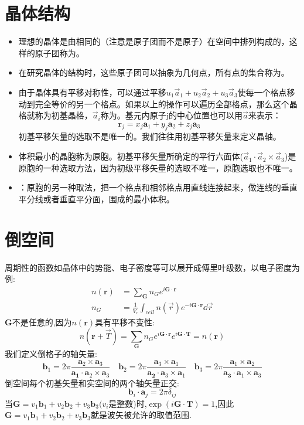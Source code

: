 \section{晶体结构}
\begin{itemize}
    \item 理想的晶体是由相同的（注意是原子团而不是原子）在空间中排列构成的，这样的原子团称为。
    \item 在研究晶体的结构时，这些原子团可以抽象为几何点，所有点的集合称为。
    \item 由于晶体具有平移对称性，可以通过平移$u_1\vec{a}_1+u_2\vec{a}_2+u_3\vec{a}_3$使每一个格点移动到完全等价的另一个格点。如果以上的操作可以遍历全部格点，那么这个晶格就称为初基晶格，$\vec{a}_i$称为。基元内原子j的中心位置也可以用$\vec{a}$来表示：
    \begin{equation*}
        \mathbf{r}_j=x_j\mathbf{a}_1+y_j\mathbf{a}_2+z_j\mathbf{a}_3
    \end{equation*}初基平移矢量的选取不是唯一的。我们往往用初基平移矢量来定义晶轴。
    \item 体积最小的晶胞称为原胞。初基平移矢量所确定的平行六面体($\vec{a}_1\cdot\vec{a}_2\times\vec{a}_3$)是原胞的一种选取方法，因为初级平移矢量的选取不唯一，原胞选取也不唯一。
    \item {}：原胞的另一种取法，把一个格点和相邻格点用直线连接起来，做连线的垂直平分线或者垂直平分面，围成的最小体积。
\end{itemize}
\section{倒空间}
周期性的函数如晶体中的势能、电子密度等可以展开成傅里叶级数，以电子密度为例:
\begin{align}
    n(\mathbf{r})&=\sum_{\mathbf{G}}n_Ge^{i\mathbf{G}\cdot\mathbf{r}}\\
    n_G&=\frac{1}{V_c}\int_{cell}n(\vec{r})e^{-i\mathbf{G\cdot r}}\dd{\vec{r}}
\end{align}
$\mathbf{G}$不是任意的,因为$n(\mathbf{r})$具有平移不变性:
\begin{equation}
    n(\mathbf{r}+\vec{T})=\sum_{\mathbf{G}}n_Ge^{i\mathbf{G}\cdot\mathbf{r}}e^{i\mathbf{G}\cdot\mathbf{T}}=n(\mathbf{r})
\end{equation}
我们定义倒格子的轴矢量:
\begin{equation}
    \mathbf{b}_1=2\pi\frac{\mathbf{a}_2\times\mathbf{a}_3}{\mathbf{a_1}\cdot\mathbf{a}_2\times\mathbf{a}_3}
    \quad
    \mathbf{b}_2=2\pi\frac{\mathbf{a}_3\times\mathbf{a}_1}{\mathbf{a_2}\cdot\mathbf{a}_3\times\mathbf{a}_1}
    \quad
    \mathbf{b}_3=2\pi\frac{\mathbf{a}_1\times\mathbf{a}_2}{\mathbf{a_3}\cdot\mathbf{a}_1\times\mathbf{a}_3}
\end{equation}
倒空间每个初基矢量和实空间的两个轴矢量正交:
\begin{equation}
    \mathbf{b}_i\cdot\mathbf{a}_j=2\pi\delta_{ij}
\end{equation}
当$\mathbf{G}=v_1\mathbf{b}_1+v_2\mathbf{b}_2+v_3\mathbf{b}_3(v_i$是整数)时,$\exp(i\mathbf{G}\cdot\mathbf{T})=1$,因此$\mathbf{G}=v_1\mathbf{b}_1+v_2\mathbf{b}_2+v_3\mathbf{b}_3$就是波矢被允许的取值范围.
